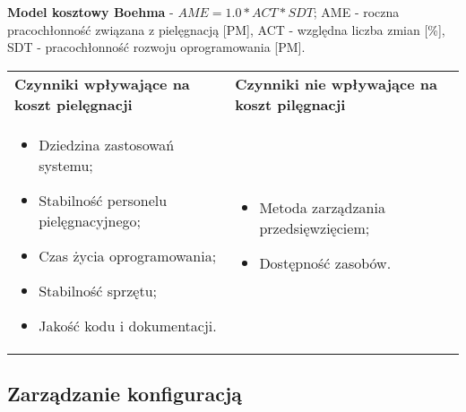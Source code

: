 \documentclass[../main.tex]{subfiles}
\begin{document}
    \textbf{Model kosztowy Boehma} - $AME = 1.0 * ACT * SDT$; AME - roczna pracochłonność związana
    z pielęgnacją [PM], ACT - względna liczba zmian [\%], SDT - pracochłonność rozwoju oprogramowania [PM].


    \begin{table}[H]
        \begin{center}
            \begin{tabular}{p{.5\linewidth} p{.5\linewidth}}
                \textbf{Czynniki wpływające na koszt pielęgnacji} & \textbf{Czynniki nie wpływające na koszt pilęgnacji}\\

                \begin{itemize}
                    \item  Dziedzina zastosowań systemu;
                    \item Stabilność personelu pielęgnacyjnego;
                    \item Czas życia oprogramowania;
                    \item Stabilność sprzętu;
                    \item Jakość kodu i dokumentacji.
                \end{itemize}
                &
                \begin{itemize}
                    \item Metoda zarządzania przedsięwzięciem;
                    \item Dostępność zasobów.
                \end{itemize}
            \end{tabular}
        \end{center}
    \end{table}

    \subsection{Zarządzanie konfiguracją}
\end{document}
